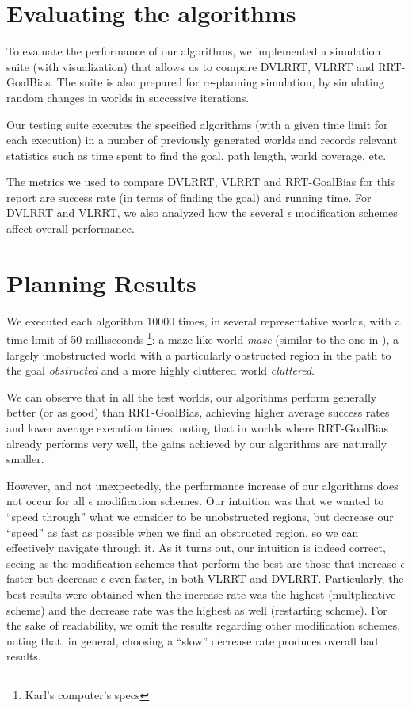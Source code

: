 \documentclass[10pt,twoside,twocolumn]{article}
\begin{document}
\section{Evaluating the algorithms}

To evaluate the performance of our algorithms, we implemented a simulation suite (with visualization) that allows
us to compare DVLRRT, VLRRT and RRT-GoalBias. The suite is also prepared for re-planning simulation, by simulating
random changes in worlds in successive iterations.

Our testing suite executes the specified algorithms (with a given time limit for each execution) in a number of previously
generated worlds and records relevant statistics such as time spent to find the goal, path length, world coverage, etc.

The metrics we used to compare DVLRRT, VLRRT and RRT-GoalBias for this report are success rate (in terms of finding the goal) and running
time. For DVLRRT and VLRRT, we also analyzed how the several $\epsilon$ modification schemes affect overall performance.

\section{Planning Results}

We executed each algorithm 10000 times, in several representative
worlds, with a time limit of 50 milliseconds \footnote{Karl's
  computer's specs}: 
a maze-like world \emph{maze} (similar to the one in
\cite{Bruce02real-timerandomized}), a largely unobstructed world with
a particularly obstructed region 
in the path to the goal \emph{obstructed} and a more highly cluttered world \emph{cluttered}.

We can observe that in all the test worlds, our algorithms perform
generally better (or as good) than RRT-GoalBias,
achieving higher average success rates and lower average execution
times, noting that in worlds where RRT-GoalBias already performs
very well, the gains achieved by our algorithms are naturally smaller.

However, and not unexpectedly, the performance increase of our algorithms does not occur for all
$\epsilon$ modification schemes.
Our intuition was that we wanted to ``speed through'' what we consider to be unobstructed regions, but decrease our
``speed'' as fast as possible when we find an obstructed region, so we can effectively navigate through it. As it turns
out, our intuition is indeed correct, seeing as the modification schemes that perform the best are those that
increase $\epsilon$ faster but decrease $\epsilon$ even faster, in both VLRRT and DVLRRT. Particularly, the best
results were obtained when the increase rate was the highest (multplicative scheme) and the decrease rate was the 
highest as well (restarting scheme). For the sake of readability, we
omit the results regarding other modification schemes, noting that, in
general, choosing a ``slow'' decrease rate produces overall bad
results.
\end{document}
